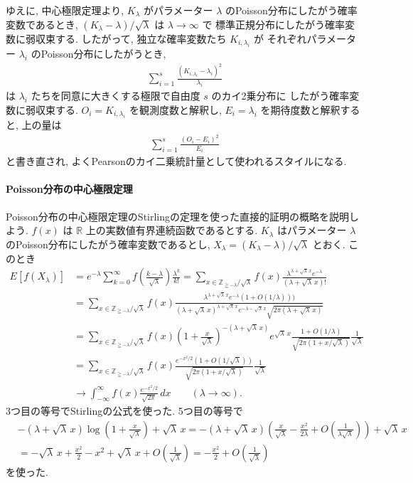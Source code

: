 \documentclass[12pt,twoside]{jarticle}
\newcommand\Z{{\mathbb Z}} %
\newcommand\R{{\mathbb R}} %
\theoremstyle{jplain}
\theoremstyle{jplain}
\theoremstyle{jplain}
\numberwithin{theorem}{section}
\numberwithin{equation}{section}
\numberwithin{figure}{section}
\numberwithin{table}{section}
\begin{document}
ゆえに, 中心極限定理より, 
$K_\lambda$ がパラメーター $\lambda$ のPoisson分布にしたがう確率変数であるとき, $(K_\lambda-\lambda)/\sqrt{\lambda}$ は $\lambda\to\infty$ で
標準正規分布にしたがう確率変数に弱収束する.
したがって, 独立な確率変数たち $K_{i,\lambda_i}$ が
それぞれパラメーター $\lambda_i$ のPoisson分布にしたがうとき, 
\begin{align*}
\sum_{i=1}^s \frac{(K_{i,\lambda_i}-\lambda_i)^2}{\lambda_i}
\end{align*}
は $\lambda_i$ たちを同意に大きくする極限で自由度 $s$ のカイ2乗分布に
したがう確率変数に弱収束する. $O_i=K_{i,\lambda_i}$ を観測度数と解釈し, 
$E_i=\lambda_i$ を期待度数と解釈すると, 上の量は
\begin{align*}
\sum_{i=1}^s \frac{(O_i-E_i)^2}{E_i}
\end{align*}
と書き直され, よくPearsonのカイ二乗統計量として使われるスタイルになる.


\paragraph{Poisson分布の中心極限定理}
Poisson分布の中心極限定理のStirlingの定理を使った直接的証明の概略を説明しよう.
$f(x)$ は $\R$ 上の実数値有界連続函数であるとする.
$K_\lambda$ はパラメーター $\lambda$ のPoisson分布にしたがう確率変数であるとし,
$X_\lambda=(K_\lambda-\lambda)/\sqrt{\lambda}$ とおく.
このとき
\begin{align*}
E[f(X_\lambda)]
&
=e^{-\lambda}\sum_{k=0}^\infty
f\left(\frac{k-\lambda}{\sqrt{\lambda}}\right)\frac{\lambda^k}{k!}
=\sum_{x\in\Z_{\geqq-\lambda}/\sqrt{\lambda}}
f(x)\frac{\lambda^{\lambda+\sqrt{\lambda}\,x}e^{-\lambda}}{(\lambda+\sqrt{\lambda}\,x)!}
\\ &
=\sum_{x\in\Z_{\geqq-\lambda}/\sqrt{\lambda}}
f(x)
\frac
{\lambda^{\lambda+\sqrt{\lambda}\,x}e^{-\lambda}(1+O(1/\lambda)))}{(\lambda+\sqrt{\lambda}\,x)^{\lambda+\sqrt{\lambda}\,x}
e^{-\lambda-\sqrt{\lambda}\,x}
\sqrt{2\pi(\lambda+\sqrt{\lambda}\,x)}}
\\ &
=\sum_{x\in\Z_{\geqq-\lambda}/\sqrt{\lambda}}
f(x)
\left(1+\frac{x}{\sqrt{\lambda}}\right)^{-(\lambda+\sqrt{\lambda}\,x)} e^{\sqrt{\lambda}\,x}
\frac{1+O(1/\lambda)}{\sqrt{2\pi(1+x/\sqrt{\lambda})}}\frac{1}{\sqrt{\lambda}}
\\ &
=\sum_{x\in\Z_{\geqq-\lambda}/\sqrt{\lambda}}
f(x)
\frac{e^{-x^2/2}(1+O(1/\sqrt{\lambda}))}{\sqrt{2\pi(1+x/\sqrt{\lambda})}}\frac{1}{\sqrt{\lambda}}
\\ &
\longrightarrow
\int_{-\infty}^\infty f(x)\frac{e^{-x^2/2}}{\sqrt{2\pi}}\,dx
\qquad (\lambda\to\infty).
\end{align*}
3つ目の等号でStirlingの公式を使った.
5つ目の等号で
\begin{align*}
&
-(\lambda+\sqrt{\lambda}\,x)\log\left(1+\frac{x}{\sqrt{\lambda}}\right)+\sqrt{\lambda}\,x
=-(\lambda+\sqrt{\lambda}\,x)
\left(
 \frac{x}{\sqrt{\lambda}}-\frac{x^2}{2\lambda}+O\left(\frac{1}{\lambda\sqrt{\lambda}}\right)
\right)
+\sqrt{\lambda}\,x
\\ &
=-\sqrt{\lambda}\,x+\frac{x^2}{2}-x^2+\sqrt{\lambda}\,x
+O\left(\frac{1}{\sqrt{\lambda}}\right)
=-\frac{x^2}{2}
+O\left(\frac{1}{\sqrt{\lambda}}\right)
\end{align*}
を使った. 
\end{document}
